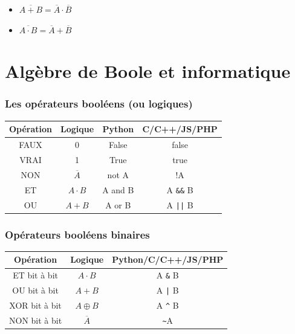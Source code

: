 \begin{propriete}{}
	\begin{itemize}
		\item $\overline{A + B} = \overline{A} \cdot \overline{B}$
		\item $\overline{A \cdot B} = \overline{A} + \overline{B}$
	\end{itemize}
\end{propriete}

\section{Algèbre de Boole et informatique}

\begin{minipage}[t]{0.49\linewidth}
	\subsubsection*{Les opérateurs booléens (ou logiques)}

\begin{tabular}{|c|c|c|c|}
	
	\textbf{Opération} & \textbf{Logique} & \textbf{Python} & \textbf{C/C++/JS/PHP} \\
	\hline
	FAUX & 0 & False & false \\
	VRAI & 1 & True & true \\
	NON & $\overline{A}$ & not A & !A \\
	ET & $A \cdot B$ & A and B & A \verb|&&| B \\
	OU & $A + B$ & A or B & A \verb+||+ B \\
	\hline
\end{tabular}


\end{minipage}\hfill
\begin{minipage}[t]{0.49\linewidth}
	\subsubsection*{Opérateurs booléens binaires}

\begin{tabular}{|c|c|c|}
	
	\textbf{Opération} & \textbf{Logique} & \textbf{Python/C/C++/JS/PHP} \\
	\hline
	ET bit à bit & $A \cdot B$ & A \verb|&| B  \\
	OU bit à bit & $A + B$ & A \verb+|+ B  \\
	XOR bit à bit & $A \oplus B$ & A \verb|^| B  \\
	NON bit à bit & $\overline{A}$ & \verb|~|A  \\
	\hline
\end{tabular}

\end{minipage}

